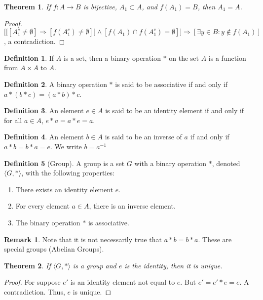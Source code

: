 \documentclass[oneside]{book}
\newtheorem{theorem}{Theorem}[section]
\theoremstyle{definition}
\newtheorem{definition}{Definition}[section]
\newtheorem{remark}{Remark}[section]
\begin{document}
\begin{theorem}
If $f:A\rightarrow B$ is bijective, $A_1\subset A$, and $f(A_1) = B$, then $A_1=A$.
\end{theorem}
\begin{proof}
$\Big[\big[[A_1^c \ne \emptyset]\Rightarrow [f(A_1^c) \ne \emptyset]\big]\land[f(A_1)\cap f(A_1^c) = \emptyset]\Big]\Rightarrow [\exists y\in B:y\notin f(A_1)]$, a contradiction.
\end{proof}

\begin{definition}
If $A$ is a set, then a binary operation $*$ on the set $A$ is a function from $A\times A$ to $A$.
\end{definition}

\begin{definition}
A binary operation $*$ is said to be associative if and only if $a*(b*c) = (a*b)*c$.
\end{definition}

\begin{definition}
An element $e\in A$ is said to be an identity element if and only if for all $a\in A$, $e*a = a*e = a$.
\end{definition}

\begin{definition}
An element $b\in A$ is said to be an inverse of $a$ if and only if $a*b=b*a = e$. We write $b=a^{-1}$
\end{definition}

\begin{definition}[Group]
A group is a set $G$ with a binary operation $*$, denoted $\langle G,* \rangle$, with the following properties: 
\begin{enumerate}
\item There exists an identity element $e$.
\item For every element $a\in A$, there is an inverse element.
\item The binary operation $*$ is associative.
\end{enumerate}
\end{definition}

\begin{remark}
Note that it is not necessarily true that $a*b = b*a$. These are special groups (Abelian Groups).
\end{remark}

\begin{theorem}
If $\langle G, * \rangle$ is a group and $e$ is the identity, then it is unique.
\end{theorem}
\begin{proof}
For suppose $e'$ is an identity element not equal to $e$. But $e' = e'*e  = e$. A contradiction. Thus, $e$ is unique.
\end{proof}
\end{document}
